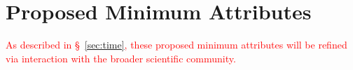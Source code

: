 \documentclass[DM,lsstdraft,toc]{lsstdoc}
\begin{document}

\clearpage
\section{Proposed Minimum Attributes}\label{sec:mvp}

\textcolor{red}{As described in \S~\ref{sec:time}, these proposed minimum attributes will be refined via interaction with the broader scientific community.}
\end{document}
